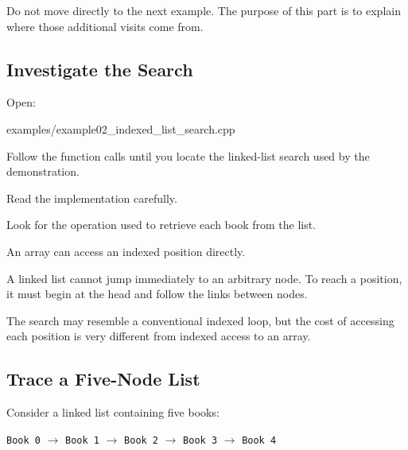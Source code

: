 \documentclass{csc2059practical}
\begin{document}
Do not move directly to the next example. The purpose of this part is to explain
where those additional visits come from.


\subsection{Investigate the Search}

Open:

\begin{terminal}
examples/example02_indexed_list_search.cpp
\end{terminal}

Follow the function calls until you locate the linked-list search used by the
demonstration.

Read the implementation carefully.

Look for the operation used to retrieve each book from the list.

\begin{importantnote}
An array can access an indexed position directly.

A linked list cannot jump immediately to an arbitrary node. To reach a position,
it must begin at the head and follow the links between nodes.
\end{importantnote}

The search may resemble a conventional indexed loop, but the cost of accessing
each position is very different from indexed access to an array.


\subsection{Trace a Five-Node List}

Consider a linked list containing five books:

\begin{center}
\texttt{Book 0}
$\longrightarrow$
\texttt{Book 1}
$\longrightarrow$
\texttt{Book 2}
$\longrightarrow$
\texttt{Book 3}
$\longrightarrow$
\texttt{Book 4}
\end{center}
\end{document}
